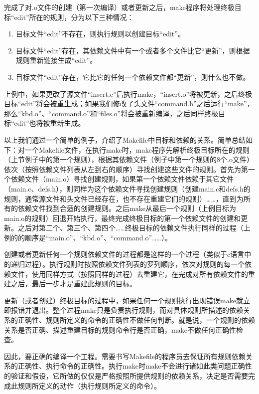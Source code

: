完成了对.o文件的创建（第一次编译）或者更新之后，make程序将处理终极目标“edit”所在的规则，分为以下三种情况：
\begin{enumerate}
    \itemsep=0pt \parskip=0pt
    \item 目标文件“edit”不存在，则执行规则以创建目标“edit”。
    \item 目标文件“edit”存在，其依赖文件中有一个或者多个文件比它“更新”，则根据规则重新链接生成“edit”。
    \item 目标文件“edit”存在，它比它的任何一个依赖文件都“更新”，则什么也不做。
\end{enumerate}

上例中，如果更改了源文件“insert.c”后执行make，“insert.o”将被更新，之后终极目标“edit”将会被重生成；如果我们修改了头文件“command.h”之后运行“make”，那么“kbd.o”、“command.o”和“files.o”将会被重新编译，之后同样终极目标“edit”也将被重新生成。

以上我们通过一个简单的例子，介绍了Makefile中目标和依赖的关系。简单总结如下：对一个Makefile文件，在执行make时，make程序先解析终极目标所在的规则（上节例子中的第一个规则），根据其依赖文件（例子中第一个规则的8个.o文件）依次（按照依赖文件列表从左到右的顺序）寻找创建这些文件的规则。首先为第一个依赖文件（main.o）寻找创建规则，如果第一个依赖文件依赖于其它文件（main.c、defs.h），则同样为这个依赖文件寻找创建规则（创建main.c和defs.h的规则，通常源文件和头文件已经存在，也不存在重建它们的规则）……，直到为所有的依赖文件找到合适的创建规则。之后make从最后一个规则（上例目标为main.o的规则）回退开始执行，最终完成终极目标的第一个依赖文件的创建和更新。之后对第二个、第三个、第四个……终极目标的依赖文件执行同样的过程（上例的的顺序是“main.o”、“kbd.o”、“command.o”……）。

创建或者更新任何一个规则依赖文件的过程都是这样的一个过程（类似于c语言中的递归过程）。执行规则时按照依赖文件列表的罗列顺序，依次对规则的每一个依赖文件，使用同样方式（按照同样的过程）去重建它，在完成对所有依赖文件的重建之后，最后一步才是重建此规则的目标。

更新（或者创建）终极目标的过程中，如果任何一个规则执行出现错误make就立即报错并退出。整个过程make只是负责执行规则，而对具体规则所描述的依赖关系的正确性、规则所定义的命令的正确性不做任何判断。就是说，一个规则的依赖关系是否正确、描述重建目标的规则命令行是否正确，make不做任何正确性检查。

因此，要正确的编译一个工程。需要书写Makefile的程序员去保证所有规则依赖关系的正确性、执行命令的正确性。执行make时make不会进行诸如此类问题正确性的验证和假设，它所做的仅仅是严格按照所提供规则的依赖关系，决定是否需要完成此规则所定义的动作（执行规则所定义的命令）。


